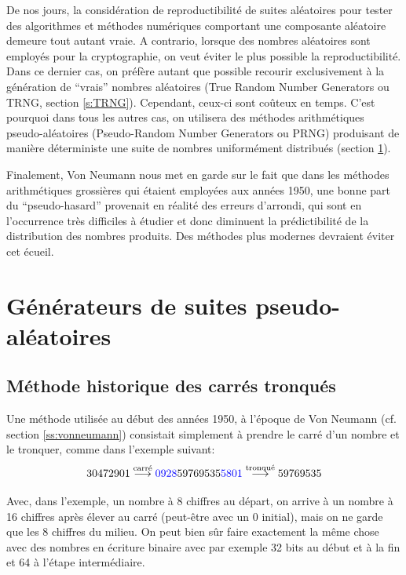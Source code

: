 \documentclass{scrartcl}
\begin{document}
De nos jours, la considération de reproductibilité de suites aléatoires pour
tester des algorithmes et méthodes numériques comportant une composante
aléatoire demeure tout autant vraie. A contrario, lorsque des nombres aléatoires
sont employés pour la cryptographie, on veut éviter le plus possible la
reproductibilité. Dans ce dernier cas, on préfère autant que possible recourir
exclusivement à la génération de ``vrais'' nombres aléatoires (True Random
Number Generators ou TRNG, section \ref{s:TRNG}). Cependant, ceux-ci sont
coûteux en temps. C'est pourquoi dans tous les autres cas, on utilisera des
méthodes arithmétiques pseudo-aléatoires (Pseudo-Random Number Generators ou
PRNG) produisant de manière déterministe une suite de nombres uniformément
distribués (section \ref{s:PRNG}).
\par\medskip

Finalement, Von Neumann nous met en garde sur le fait que dans les méthodes
arithmétiques grossières qui étaient employées aux années 1950, une bonne part
du ``pseudo-hasard'' provenait en réalité des erreurs d'arrondi, qui sont en
l'occurrence très difficiles à étudier et donc diminuent la prédictibilité de la
distribution des nombres produits. Des méthodes plus modernes devraient éviter
cet écueil.


\section{Générateurs de suites pseudo-aléatoires}\label{s:PRNG}

\subsection{Méthode historique des carrés tronqués}\label{ss:carres}
Une méthode utilisée au début des années 1950, à l'époque de Von Neumann
(cf. section \ref{ss:vonneumann}) consistait simplement à prendre le carré d'un
nombre et le tronquer, comme dans l'exemple suivant:
\[
  30472901 \overset{\text{carré}}\longrightarrow {\color{blue}0928}59769535{\color{blue}5801}
  \overset{\text{tronqué}}\longrightarrow 59769535
\]

Avec, dans l'exemple, un nombre à 8 chiffres au départ, on arrive à un nombre à
16 chiffres après élever au carré (peut-être avec un 0 initial), mais on ne
garde que les 8 chiffres du milieu. On peut bien sûr faire exactement la même
chose avec des nombres en écriture binaire avec par exemple 32 bits au début et
à la fin et 64 à l'étape intermédiaire.
\end{document}
